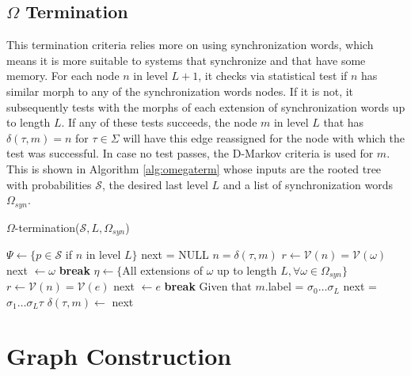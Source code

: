 {\subsection{$\Omega$ Termination}

This termination criteria relies more on using synchronization words, which means it is more suitable to systems that synchronize and that have some memory. For each node $n$ in level $L+1$, it checks via statistical test if $n$ has similar morph to any of the synchronization words nodes. If it is not, it subsequently tests with the morphs of each extension of synchronization words up to length $L$. If any of these tests succeeds, the node $m$ in level $L$ that has $\delta(\tau,m) = n$ for $\tau \in \Sigma$ will have this edge reassigned for the node with which the test was successful. In case no test passes, the D-Markov criteria is used for $m$. This is shown in Algorithm \ref{alg:omegaterm} whose inputs are the rooted tree with probabilities $\mathcal{S}$, the desired last level $L$ and a list of synchronization words $\Omega_{syn}$.  

  \begin{algorithm}
  \caption{$\Omega$-termination($\mathcal{S}, L, \Omega_{syn}$)\label{alg:omegaterm}}
    \begin{algorithmic}[1]
      	\State $\Psi \gets \{p \in \mathcal{S}$ if $n$ in level $L\}$
      		\State next = NULL
      		\For{$\tau \in \Sigma$}
      			\State $n = \delta(\tau,m)$
      				\State $r \gets \mathcal{V}(n) = \mathcal{V}(\omega)$
      					\State next $\gets \omega$
      					\State \textbf{break}
      				\EndIf
      			\EndFor
      				\State $\eta \gets \{$All extensions of $\omega$ up to length $L, \forall \omega \in \Omega_{syn}\}$
      				\State $r \gets \mathcal{V}(n) = \mathcal{V}(e)$
      						\State next $\gets e$
      						\State \textbf{break}
      					\EndIf
      				\EndFor
      			\EndIf
      				\State Given that $m$.label = $\sigma_0\ldots\sigma_L$
      				\State next = $\sigma_1\ldots\sigma_L\tau$
      			\EndIf
      			\State $\delta(\tau,m) \gets$ next
      		\EndFor
      	\EndFor
      \EndProcedure
    \end{algorithmic}
  \end{algorithm}

\section{Graph Construction}

}
